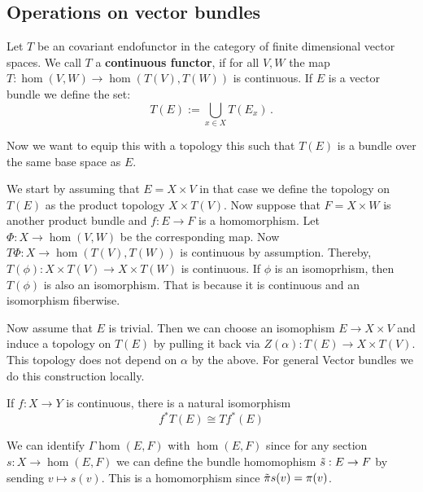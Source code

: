 \subsection{Operations on vector bundles}
\begin{definition}
	Let $T$ be an covariant endofunctor in the category of finite dimensional vector spaces. We call $T$ a \textbf{continuous functor}, if for all $V,W$ the map $T:\hom(V,W)\to \hom(T(V),T(W))$ is continuous. If $E$  is a vector bundle we define the set:
	\begin{equation*}
		T(E):=\bigcup_{x\in X}T(E_x)\,.
	\end{equation*} 
\end{definition}
Now we want to equip this with a topology this such that $T(E)$ is a bundle over the same base space as $E$.
\begin{definition}\label{def: Constructing new bundles}
	We start by assuming that $E=X\times V$ in that case we define the topology on $T(E)$ as the product topology $X\times T(V)$. Now suppose that $F=X\times W$ is another product bundle and $f:E\to F$ is a homomorphism. Let $\Phi: X \to \hom(V,W)$ be the corresponding map. Now $T\Phi: X\to \hom(T(V),T(W))$ is continuous by assumption. Thereby, $T(\phi):X\times T(V)\to X\times T(W)$ is continuous. If $\phi$ is an isomoprhism, then $T(\phi)$ is also an isomorphism. That is because it is continuous and an isomorphism fiberwise.
	
	Now assume that $E$ is trivial. Then we can choose an isomophism $E\to X\times V$ and induce a topology on $T(E)$ by pulling it back via $Z(\alpha):T(E)\to X\times T(V)$. This topology does not depend on $\alpha$ by the above. 
	For general Vector bundles we do this construction locally. 
	
	If $f:X\to Y$ is continuous, there is a natural isomorphism
	\begin{equation*}
		f^*T(E)\cong Tf^*(E)
	\end{equation*}
\end{definition}

\begin{corollary}\label{cor: sections into hom(E,F) = hom(E,F)}
	We can identify $\Gamma \hom(E,F)$ with $\hom(E,F)$ since for any section $s:X\to \hom(E,F)$ we can define the bundle homomophism $\Tilde{s}:E\to F$ by sending $v\mapsto s(v)$. This is a homomorphism since $\Tilde{\pi}s(v)=\pi(v)$. 
\end{corollary}
